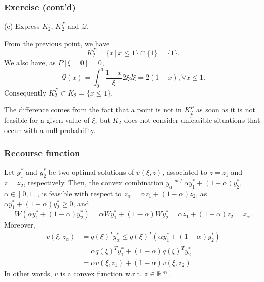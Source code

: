 \documentclass{beamer}
\newtheorem{theo}{Theorem}
\def\bxi{\boldsymbol\xi}
\def\bxi{\boldsymbol\xi}
\begin{document}
\begin{frame}
\frametitle{Exercise (cont'd)}
	
{\blue (c)} Express $K_2$, $K_2^P$ and $\mathcal{Q}$.
	
\mbox{}
	
From the previous point, we have
\[
K_2^P = \lbrace x \,|\, x \leq 1 \rbrace \cap \lbrace 1 \rbrace =
\lbrace 1 \rbrace.
\]
We also have, as $P[\xi = 0] = 0$,
\[
\mathcal{Q}(x) = \int_0^1 \frac{1-x}{\xi} 2\xi d\xi = 2(1-x), \forall
x \leq 1.
\]
Consequently $K_2^P \subset K_2 = \lbrace x \leq 1 \rbrace$.

\mbox{}

The difference comes from the fact that a point is not in $K_2^P$ as soon as it is not feasible for a given value of $\xi$, but $K_2$ does not consider unfeasible situations that occur with a null probability.
	
	
	
\end{frame}

\begin{frame}
\frametitle{Recourse function}

Let $y^*_1$ and $y^*_2$ be two optimal solutions of $v(\xi, z)$, associated to $z = z_1$ and $z = z_2$, respectively.
Then, the convex combination $y_{\alpha} \overset{def}{=} \alpha y_1^*+(1-\alpha)y_2^*$, $\alpha \in [0,1]$, is feasible with respect to $z_{\alpha} = \alpha z_1 + (1-\alpha) z_2$, as $\alpha y_1^*+(1-\alpha)y_2^* \geq 0$, and
$$
W(\alpha y_1^*+(1-\alpha)y_2^*)
= \alpha W y_1^* + (1-\alpha) W y_2^*
= \alpha z_1 + (1-\alpha) z_2 = z_{\alpha}.
$$
Moreover,
\begin{align*}
v(\xi, z_{\alpha}) & = q(\xi)^Ty_{\alpha}^* \leq
q(\xi)^T(\alpha y_1^*+(1-\alpha)y_2^*) \\
& = \alpha q(\xi)^T y_1^*+(1-\alpha)q(\xi)^Ty_2^* \\
& = \alpha v(\xi, z_1) + (1-\alpha) v(\xi, z_2).
\end{align*}
In other words, $v$ is a convex function w.r.t. $z \in {\mathbb{R}}^m$.


\end{frame}
\end{document}
